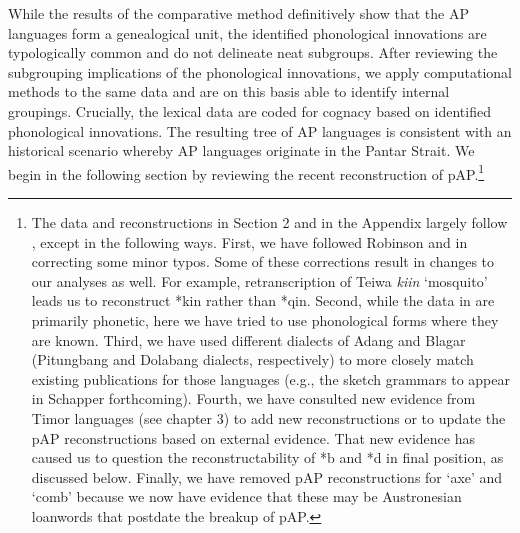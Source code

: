 While the results of the comparative method definitively show that the AP languages form a genealogical unit, the identified phonological innovations are typologically common and do not delineate neat subgroups. After reviewing the subgrouping implications of the phonological innovations, we apply computational methods to the same data and are on this basis able to identify internal groupings. Crucially, the lexical data are coded for cognacy based on identified phonological innovations. The resulting tree of AP languages is consistent with an historical scenario whereby AP languages originate in the Pantar Strait. We begin in the following section by reviewing the recent reconstruction of pAP.\footnote{ The data and reconstructions in Section 2 and in the Appendix largely follow \citep{HoltonEtAl2012}, except in the following ways. First, we have followed Robinson and \citet{Holton2012} in correcting some minor typos. Some of these corrections result in changes to our analyses as
well. For example, retranscription of Teiwa \textit{ki{\textglotstop}in }`mosquito' leads us to reconstruct *kin rather than *qin. Second, while the data in \citep{HoltonEtAl2012} are primarily phonetic, here we have tried to use phonological forms where they are known. Third, we have used different dialects of Adang and Blagar (Pitungbang and Dolabang dialects, respectively) to more closely match existing publications for those languages (e.g., the sketch grammars to appear in Schapper forthcoming). Fourth, we have consulted new evidence from Timor languages (see chapter 3) to add new reconstructions or to update the pAP reconstructions based on external evidence. That new evidence has caused us to question the reconstructability of *b and *d in final position, as discussed below. Finally, we have removed pAP reconstructions for `axe' and `comb' because we now have evidence that these may be Austronesian loanwords that postdate the breakup of pAP.}

